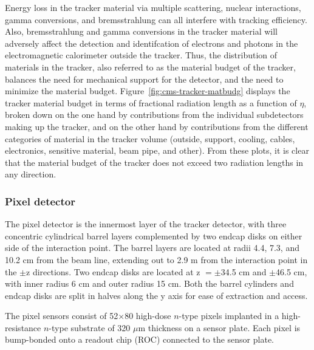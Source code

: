 Energy loss in the tracker material via multiple scattering, nuclear interactions, gamma conversions, and bremsstrahlung can all interfere with tracking efficiency. Also, bremsstrahlung and gamma conversions in the tracker material will adversely affect the detection and identifcation of electrons and photons in the electromagnetic calorimeter outside the tracker. Thus, the distribution of materials in the tracker, also referred to as the material budget of the tracker, balances  the need for mechanical support for the detector, and the need to minimize the material budget. Figure~\ref{fig:cms-tracker-matbudg} displays the tracker material budget in terms of fractional radiation length as a function of $\eta$, broken down on the one hand by contributions from the individual subdetectors making up the tracker, and on the other hand by contributions from the different categories of material in the tracker volume (outside, support, cooling, cables, electronics, sensitive material, beam pipe, and other). From these plots, it is clear that the material budget of the tracker does not exceed two radiation lengths in any direction.

\subsubsection{Pixel detector\label{sec:cms-pixel}}

The pixel detector is the innermost layer of the tracker detector, with three concentric cylindrical barrel layers complemented by two endcap disks on either side of the interaction point. The barrel layers are located at radii 4.4, 7.3, and 10.2 cm from the beam line, extending out to 2.9 m from the interaction point in the $\pm$z directions. Two endcap disks are located at z $= \pm$34.5 cm and $\pm$46.5 cm, with inner radius 6 cm and outer radius 15 cm. Both the barrel cylinders and endcap disks are split in halves along the y axis for ease of extraction and access.

The pixel sensors consist of 52$\times$80 high-dose $n$-type pixels implanted in a high-resistance $n$-type substrate of 320 $\mu$m thickness on a sensor plate. Each pixel is bump-bonded onto a readout chip (ROC) connected to the sensor plate.

